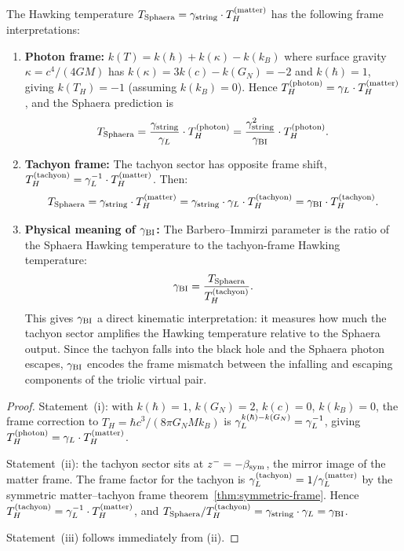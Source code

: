 \begin{proposition}
\label{prop:hawking-gBI-tachyon}
The Hawking temperature $T_{\mathrm{Sphaera}} = \gamma_{\mathrm{string}}\cdot T_H^{(\mathrm{matter})}$
has the following frame interpretations:
\begin{enumerate}[label=(\roman*)]
  \item \textbf{Photon frame:} $k(T) = k(\hbar) + k(\kappa) - k(k_B)$
    where surface gravity $\kappa = c^4/(4GM)$ has
    $k(\kappa) = 3k(c) - k(G_N) = -2$ and $k(\hbar) = 1$,
    giving $k(T_H) = -1$ (assuming $k(k_B)=0$).
    Hence $T_H^{(\mathrm{photon})} = \gamma_L \cdot T_H^{(\mathrm{matter})}$,
    and the Sphaera prediction is
    \[
      T_{\mathrm{Sphaera}} = \frac{\gamma_{\mathrm{string}}}{\gamma_L}\cdot T_H^{(\mathrm{photon})}
      = \frac{\gamma_{\mathrm{string}}^2}{\gamma_{\mathrm{BI}}}\cdot T_H^{(\mathrm{photon})}.
    \]
  \item \textbf{Tachyon frame:} The tachyon sector has opposite frame shift,
    $T_H^{(\mathrm{tachyon})} = \gamma_L^{-1}\cdot T_H^{(\mathrm{matter})}$. Then:
    \[
      T_{\mathrm{Sphaera}}
      = \gamma_{\mathrm{string}}\cdot T_H^{(\mathrm{matter})}
      = \gamma_{\mathrm{string}}\cdot\gamma_L\cdot T_H^{(\mathrm{tachyon})}
      = \gamma_{\mathrm{BI}}\cdot T_H^{(\mathrm{tachyon})}.
    \]
  \item \textbf{Physical meaning of $\gamma_{\mathrm{BI}}$:} The Barbero--Immirzi parameter
    is the ratio of the Sphaera Hawking temperature to the tachyon-frame
    Hawking temperature:
    \[
      \gamma_{\mathrm{BI}} = \frac{T_{\mathrm{Sphaera}}}{T_H^{(\mathrm{tachyon})}}.
    \]
    This gives $\gamma_{\mathrm{BI}}$ a direct kinematic interpretation: it measures how much
    the tachyon sector amplifies the Hawking temperature relative to the
    Sphaera output. Since the tachyon falls into the black hole and the
    Sphaera photon escapes, $\gamma_{\mathrm{BI}}$ encodes the frame mismatch between the
    infalling and escaping components of the triolic virtual pair.
\end{enumerate}
\end{proposition}

\begin{proof}
Statement~(i): with $k(\hbar)=1$, $k(G_N)=2$, $k(c)=0$, $k(k_B)=0$,
the frame correction to $T_H = \hbar c^3/(8\pi G_N M k_B)$ is
$\gamma_L^{k(\hbar)-k(G_N)} = \gamma_L^{-1}$, giving
$T_H^{(\mathrm{photon})} = \gamma_L\cdot T_H^{(\mathrm{matter})}$.

Statement~(ii): the tachyon sector sits at $z^- = -\beta_{\mathrm{sym}}$, the mirror
image of the matter frame. The frame factor for the tachyon is
$\gamma_L^{(\mathrm{tachyon})} = 1/\gamma_L^{(\mathrm{matter})}$ by the symmetric
matter--tachyon frame theorem~\ref{thm:symmetric-frame}. Hence
$T_H^{(\mathrm{tachyon})} = \gamma_L^{-1}\cdot T_H^{(\mathrm{matter})}$, and
$T_{\mathrm{Sphaera}}/T_H^{(\mathrm{tachyon})}
= \gamma_{\mathrm{string}}\cdot\gamma_L = \gamma_{\mathrm{BI}}$.

Statement~(iii) follows immediately from (ii).
\end{proof}

